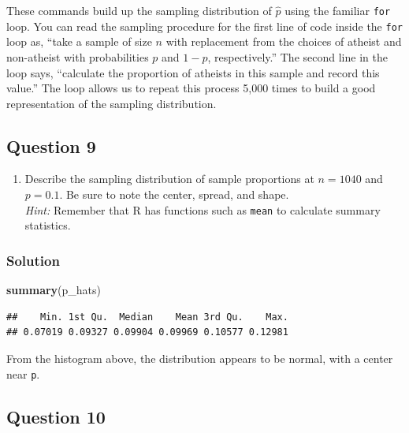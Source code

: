 \documentclass[]{article}
\newenvironment{Shaded}{\begin{snugshade}}{\end{snugshade}}
\newcommand{\KeywordTok}[1]{\textcolor[rgb]{0.13,0.29,0.53}{\textbf{#1}}}
\newcommand{\NormalTok}[1]{#1}
\providecommand{\tightlist}{%
  \setlength{\itemsep}{0pt}\setlength{\parskip}{0pt}}
\begin{document}
These commands build up the sampling distribution of \(\hat{p}\) using
the familiar \texttt{for} loop. You can read the sampling procedure for
the first line of code inside the \texttt{for} loop as, ``take a sample
of size \(n\) with replacement from the choices of atheist and
non-atheist with probabilities \(p\) and \(1 - p\), respectively.'' The
second line in the loop says, ``calculate the proportion of atheists in
this sample and record this value.'' The loop allows us to repeat this
process 5,000 times to build a good representation of the sampling
distribution.

\subsection{Question 9}\label{question-9}

\begin{enumerate}
\def\labelenumi{\arabic{enumi}.}
\setcounter{enumi}{8}
\tightlist
\item
  Describe the sampling distribution of sample proportions at
  \(n = 1040\) and \(p = 0.1\). Be sure to note the center, spread, and
  shape.\\
  \emph{Hint:} Remember that R has functions such as \texttt{mean} to
  calculate summary statistics.
\end{enumerate}

\subsubsection{Solution}\label{solution-8}

\begin{Shaded}
\begin{Highlighting}[]
\KeywordTok{summary}\NormalTok{(p_hats)}
\end{Highlighting}
\end{Shaded}

\begin{verbatim}
##    Min. 1st Qu.  Median    Mean 3rd Qu.    Max. 
## 0.07019 0.09327 0.09904 0.09969 0.10577 0.12981
\end{verbatim}

From the histogram above, the distribution appears to be normal, with a
center near \texttt{p}.

\subsection{Question 10}\label{question-10}
\end{document}
